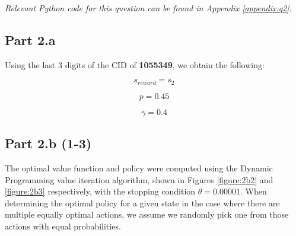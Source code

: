 \documentclass[12pt]{article}
\begin{document}
\textit{Relevant Python code for this question can be found in Appendix \ref{appendix:q2}}.

\subsection*{Part 2.a}

Using the last 3 digits of the CID of \textbf{1055349}, we obtain the following:

\begin{minipage}{.3\textwidth}
    \begin{equation}
        s_{reward} = s_2
    \end{equation}      
\end{minipage}
\begin{minipage}{.3\textwidth}
    \begin{equation}
        p = 0.45
    \end{equation}
\end{minipage}
\begin{minipage}{.3\textwidth}
    \begin{equation}
        \gamma = 0.4
    \end{equation}
\end{minipage}

\subsection*{Part 2.b (1-3)}

The optimal value function and policy were computed using the Dynamic Programming value iteration algorithm, shown in Figures \ref{figure:2b2} and \ref{figure:2b3} respectively, with the stopping condition \(\theta = 0.00001\). When determining the optimal policy for a given state in the case where there are multiple equally optimal actions, we assume we randomly pick one from those actions with equal probabilities.
\end{document}
